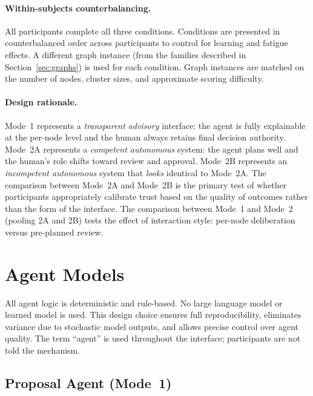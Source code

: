 \documentclass[11pt]{article}
\theoremstyle{definition}
\begin{document}
\paragraph{Within-subjects counterbalancing.}
All participants complete all three conditions.  Conditions are presented in
counterbalanced order across participants to control for learning and fatigue effects.
A different graph instance (from the families described in Section~\ref{sec:graphs})
is used for each condition.  Graph instances are matched on the number of nodes,
cluster sizes, and approximate scoring difficulty.

\paragraph{Design rationale.}
Mode~1 represents a \emph{transparent advisory} interface: the agent is fully
explainable at the per-node level and the human always retains final decision authority.
Mode~2A represents a \emph{competent autonomous} system: the agent plans well and the
human's role shifts toward review and approval.  Mode~2B represents an
\emph{incompetent autonomous} system that \emph{looks} identical to Mode~2A.  The
comparison between Mode~2A and Mode~2B is the primary test of whether participants
appropriately calibrate trust based on the quality of outcomes rather than the form of
the interface.  The comparison between Mode~1 and Mode~2 (pooling 2A and 2B) tests
the effect of interaction style: per-node deliberation versus pre-planned review.

\section{Agent Models}
\label{sec:agents}

All agent logic is deterministic and rule-based.  No large language model or learned
model is used.  This design choice ensures full reproducibility, eliminates variance due
to stochastic model outputs, and allows precise control over agent quality.  The term
``agent'' is used throughout the interface; participants are not told the mechanism.

\subsection{Proposal Agent (Mode~1)}
\label{sec:proposal_agent}
\end{document}
